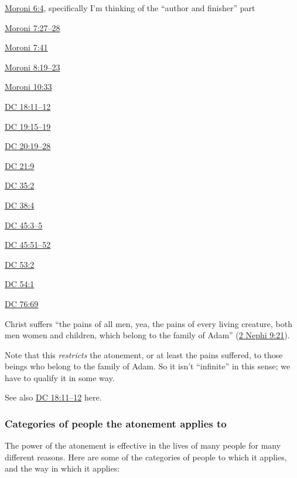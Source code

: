 \begin{compactitem}
\begin{compactitem}
					\item \hyperref[MORONI-6-4]{Moroni 6:4}, specifically I'm thinking of the ``author and finisher'' part
					\item \hyperref[MORONI-7-27]{Moroni 7:27--28}
					\item \hyperref[MORONI-7-41]{Moroni 7:41}
					\item \hyperref[MORONI-8-19]{Moroni 8:19--23}
					\item \hyperref[MORONI-10-33]{Moroni 10:33}
					\item \hyperref[DC18-11]{DC 18:11--12}
					\item \hyperref[DC19-15]{DC 19:15--19}
					\item \hyperref[DC20-19]{DC 20:19--28}
					\item \hyperref[DC21-9]{DC 21:9}
					\item \hyperref[DC35-2]{DC 35:2}
					\item \hyperref[DC38-4]{DC 38:4}
					\item \hyperref[DC45-3]{DC 45:3--5}
					\item \hyperref[DC45-51]{DC 45:51--52}
					\item \hyperref[DC53-2]{DC 53:2}
					\item \hyperref[DC54-1]{DC 54:1}
					\item \hyperref[DC76-69]{DC 76:69}
				\end{compactitem}
			\item Christ suffers ``the pains of all men, yea, the pains of every living creature, both men women and children, which belong to the family of Adam'' (\hyperref[2NEPHI-9-21]{2 Nephi 9:21}).
				\begin{compactitem}
					\item Note that this \textit{restricts} the atonement, or at least the pains suffered, to those beings who belong to the family of Adam. So it isn't ``infinite'' in this sense; we have to qualify it in some way.
					\item See also \hyperref[DC18-11]{DC 18:11--12} here.
				\end{compactitem}
		\end{compactitem}
	
	\subsubsection{Categories of people the atonement applies to}
		\label{ATONEMENT-categories}
	
		The power of the atonement is effective in the lives of many people for many different reasons. Here are some of the categories of people to which it applies, and the way in which it applies:
		
